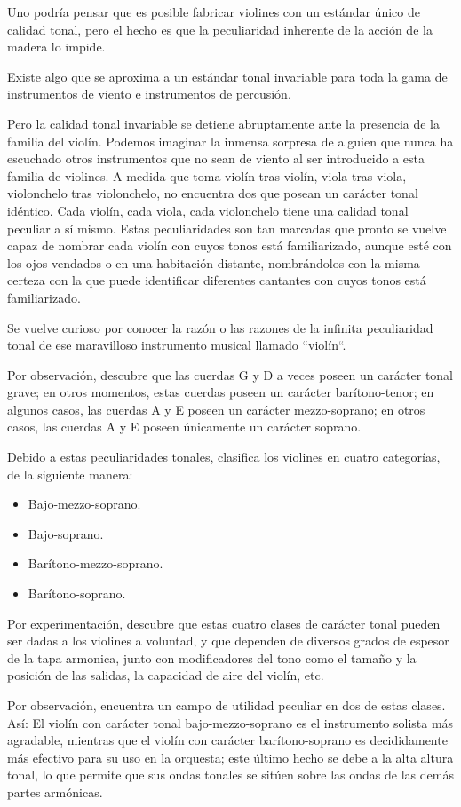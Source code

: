Uno podría pensar que es posible fabricar violines con un estándar único de calidad tonal, pero el hecho es que la peculiaridad inherente de la acción de la madera lo impide.

Existe algo que se aproxima a un estándar tonal invariable para toda la gama de instrumentos de viento e instrumentos de percusión.

Pero la calidad tonal invariable se detiene abruptamente ante la presencia de la familia del violín. Podemos imaginar la inmensa sorpresa de alguien que nunca ha escuchado otros instrumentos que no sean de viento al ser introducido a esta familia de violines. A medida que toma violín tras violín, viola tras viola, violonchelo tras violonchelo, no encuentra dos que posean un carácter tonal idéntico. Cada violín, cada viola, cada violonchelo tiene una calidad tonal peculiar a sí mismo. Estas peculiaridades son tan marcadas que pronto se vuelve capaz de nombrar cada violín con cuyos tonos está familiarizado, aunque esté con los ojos vendados o en una habitación distante, nombrándolos con la misma certeza con la que puede identificar diferentes cantantes con cuyos tonos está familiarizado.

Se vuelve curioso por conocer la razón o las razones de la infinita peculiaridad tonal de ese maravilloso instrumento musical llamado ``violín``.

Por observación, descubre que las cuerdas G y D a veces poseen un carácter tonal grave; en otros momentos, estas cuerdas poseen un carácter barítono-tenor; en algunos casos, las cuerdas A y E poseen un carácter mezzo-soprano; en otros casos, las cuerdas A y E poseen únicamente un carácter soprano.

Debido a estas peculiaridades tonales, clasifica los violines en cuatro categorías, de la siguiente manera:
\begin{itemize}
 \item Bajo-mezzo-soprano.
 \item Bajo-soprano.
 \item Barítono-mezzo-soprano.
 \item Barítono-soprano.
\end{itemize}
Por experimentación, descubre que estas cuatro clases de carácter tonal pueden ser dadas a los violines a voluntad, y que dependen de diversos grados de espesor de la tapa armonica, junto con modificadores del tono como el tamaño y la posición de las salidas, la capacidad de aire del violín, etc.

Por observación, encuentra un campo de utilidad peculiar en dos de estas clases. Así: El violín con carácter tonal bajo-mezzo-soprano es el instrumento solista más agradable, mientras que el violín con carácter barítono-soprano es decididamente más efectivo para su uso en la orquesta; este último hecho se debe a la alta altura tonal, lo que permite que sus ondas tonales se sitúen sobre las ondas de las demás partes armónicas.

